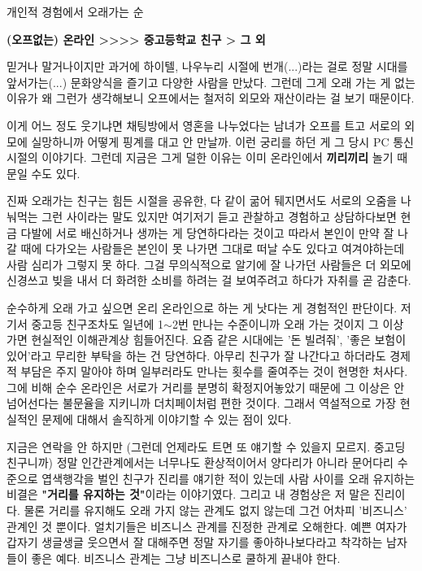 \vspace{5mm}

개인적 경험에서 오래가는 순
\vspace{5mm}

\textbf{(오프없는) 온라인 >>>> 중고등학교 친구 > 그 외}
\vspace{5mm}

믿거나 말거나이지만 과거에 하이텔, 나우누리 시절에 번개(...)라는 걸로 정말 시대를 앞서가는(...) 문화양식을 즐기고 다양한 사람을 만났다.
그런데 그게 오래 가는 게 없는 이유가 왜 그런가 생각해보니
오프에서는 철저히 외모와 재산이라는 걸 보기 때문이다.
\vspace{5mm}

이게 어느 정도 웃기냐면 채팅방에서 영혼을 나누었다는 남녀가 오프를 트고 서로의 외모에 실망하니까 어떻게 핑계를 대고 안 만날까.
이런 궁리를 하던 게 그 당시 PC 통신 시절의 이야기다.
그런데 지금은 그게 덜한 이유는 이미 온라인에서 \textbf{끼리끼리} 놀기 때문일 수도 있다.
\vspace{5mm}

진짜 오래가는 친구는 힘든 시절을 공유한, 다 같이 굶어 뒈지면서도 서로의 오줌을 나눠먹는 그런 사이라는 말도 있지만
여기저기 듣고 관찰하고 경험하고 상담하다보면 현금 다발에 서로 배신하거나 생까는 게 당연하다라는 것이고
따라서 본인이 만약 잘 나갈 때에 다가오는 사람들은 본인이 못 나가면 그대로 떠날 수도 있다고 여겨야하는데 사람 심리가 그렇지 못 하다.
그걸 무의식적으로 알기에 잘 나가던 사람들은 더 외모에 신경쓰고 빚을 내서 더 화려한 소비를 하려는 걸 보여주려고 하다가 자취를 곧 감춘다.
\vspace{5mm}

순수하게 오래 가고 싶으면 온리 온라인으로 하는 게 낫다는 게 경험적인 판단이다.
저기서 중고등 친구조차도 일년에 1$\sim$2번 만나는 수준이니까 오래 가는 것이지 그 이상 가면 현실적인 이해관계상 힘들어진다.
요즘 같은 시대에는 '돈 빌려줘', '좋은 보험이 있어'라고 무리한 부탁을 하는 건 당연하다.
아무리 친구가 잘 나간다고 하더라도 경제적 부담은 주지 말아야 하며 일부러라도 만나는 횟수를 줄여주는 것이 현명한 처사다.
그에 비해 순수 온라인은 서로가 거리를 분명히 확정지어놓았기 때문에
그 이상은 안 넘어선다는 불문율을 지키니까 더치페이처럼 편한 것이다.
그래서 역설적으로 가장 현실적인 문제에 대해서 솔직하게 이야기할 수 있는 점이 있다.
\vspace{5mm}

지금은 연락을 안 하지만 (그런데 언제라도 트면 또 얘기할 수 있을지 모르지. 중고딩 친구니까)
정말 인간관계에서는 너무나도 환상적이어서 양다리가 아니라 문어다리 수준으로 엽색행각을 벌인 친구가 진리를 얘기한 적이 있는데
사람 사이를 오래 유지하는 비결은 \textbf{"거리를 유지하는 것"}이라는 이야기였다.
그리고 내 경험상은 저 말은 진리이다.
물론 거리를 유지해도 오래 가지 않는 관계도 없지 않는데 그건 어차피 '비즈니스' 관계인 것 뿐이다.
얼치기들은 비즈니스 관계를 진정한 관계로 오해한다.
예쁜 여자가 갑자기 생글생글 웃으면서 잘 대해주면 정말 자기를 좋아하나보다라고 착각하는 남자들이 좋은 예다.
비즈니스 관계는 그냥 비즈니스로 쿨하게 끝내야 한다.
\vspace{5mm}

